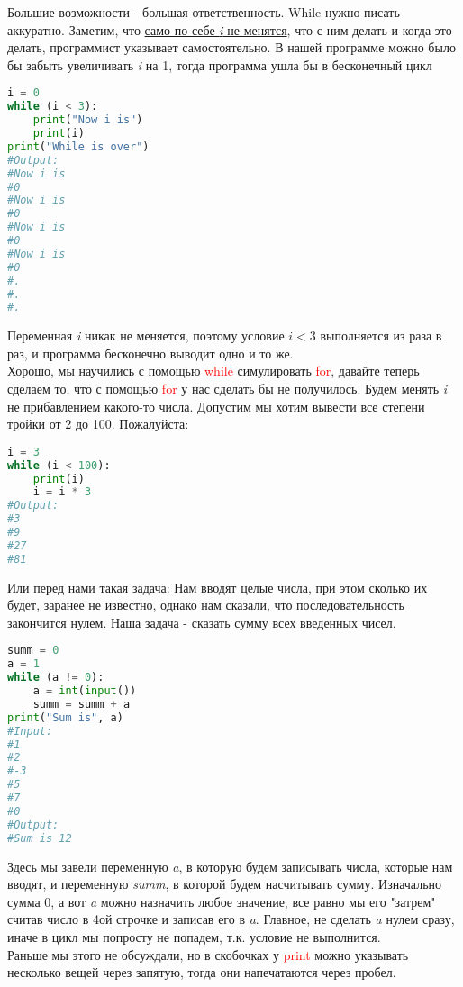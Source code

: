 \documentclass[12pt]{article} %
\newcommand \tab[1][1cm]{\hspace*{#1}}
\begin{document}
\tab Большие возможности - большая ответственность. While нужно писать аккуратно. Заметим, что \underline{само по себе \textit{i} не менятся}, что с ним делать и когда это делать, программист указывает самостоятельно. В нашей программе можно было бы забыть увеличивать \textit{i} на 1, тогда программа ушла бы в бесконечный цикл
\begin{lstlisting}[language=Python]
i = 0
while (i < 3):
	print("Now i is")
	print(i)
print("While is over")
#Output:
#Now i is
#0
#Now i is
#0
#Now i is
#0
#Now i is
#0
#.
#.
#.
\end{lstlisting}
\tab Переменная \textit{i} никак не меняется, поэтому условие $\textit{i} < 3$ выполняется из раза в раз, и программа бесконечно выводит одно и то же.\\
\tab Хорошо, мы научились с помощью \textcolor{red}{while} симулировать \textcolor{red}{for}, давайте теперь сделаем то, что с помощью \textcolor{red}{for} у нас сделать бы не получилось. Будем менять \textit{i} не прибавлением какого-то числа. Допустим мы хотим вывести все степени тройки от 2 до 100. Пожалуйста:
\begin{lstlisting}[language=Python]
i = 3
while (i < 100):
	print(i)
	i = i * 3
#Output:
#3
#9
#27
#81
\end{lstlisting}
\tab Или перед нами такая задача: Нам вводят целые числа, при этом сколько их будет, заранее не известно, однако нам сказали, что последовательность закончится нулем. Наша задача - сказать сумму всех введенных чисел.
\begin{lstlisting}[language=Python]
summ = 0
a = 1
while (a != 0):
	a = int(input())
	summ = summ + a
print("Sum is", a)
#Input:
#1
#2
#-3
#5
#7
#0
#Output:
#Sum is 12
\end{lstlisting}
\tab Здесь мы завели переменную \textit{a}, в которую будем записывать числа, которые нам вводят, и переменную \textit{summ}, в которой будем насчитывать сумму. Изначально сумма 0, а вот \textit{a} можно  назначить любое значение, все равно мы его "затрем"  считав число в 4ой строчке и записав его в \textit{a}. Главное, не сделать \textit{a} нулем сразу, иначе в цикл мы попросту не попадем, т.к. условие не выполнится.\\
\tab Раньше мы этого не обсуждали, но в скобочках у \textcolor{red}{print} можно указывать несколько вещей через запятую, тогда они напечатаются через пробел.
\end{document}
